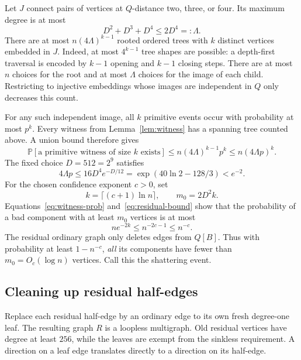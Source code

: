 \documentclass[11pt]{article}
\theoremstyle{definition}
\newcommand{\Prb}{\mathbb P}
\begin{document}
Let $J$ connect pairs of vertices at $Q$-distance two, three, or four. Its
maximum degree is at most
\[
 D^2+D^3+D^4\le2D^4=:\Lambda.
\]
There are at most $n(4\Lambda)^{k-1}$ rooted ordered trees with $k$ distinct
vertices embedded in $J$. Indeed, at most $4^{k-1}$ tree shapes are possible:
a depth-first traversal is encoded by $k-1$ opening and $k-1$ closing steps.
There are at most $n$ choices for the root and at most $\Lambda$ choices
for the image of each child. Restricting to injective embeddings whose
images are independent in $Q$ only decreases this count.

For any such independent image, all $k$ primitive events occur with
probability at most $p^k$. Every witness from Lemma~\ref{lem:witness} has
a spanning tree counted above. A union bound therefore gives
\begin{equation}\label{eq:witness-prob}
 \Prb[\text{a primitive witness of size }k\text{ exists}]
 \le n(4\Lambda)^{k-1}p^k\le n(4\Lambda p)^k.
\end{equation}
The fixed choice $D=512=2^9$ satisfies
\[
 4\Lambda p\le16D^4e^{-D/12}
 =\exp(40\ln2-128/3)<e^{-2}.
\]
For the chosen confidence exponent $c>0$, set
\begin{equation}\label{eq:residual-bound}
 k=\lceil(c+1)\ln n\rceil,\qquad m_0=2D^2k.
\end{equation}
Equations~\eqref{eq:witness-prob} and~\eqref{eq:residual-bound} show that
the probability of a bad component with at least $m_0$ vertices is at most
\begin{equation}\label{eq:shatter-success}
 ne^{-2k}\le n^{-2c-1}\le n^{-c}.
\end{equation}
The residual ordinary graph only deletes edges from $Q[B]$. Thus with
probability at least $1-n^{-c}$, \emph{all} its components have fewer than
$m_0=O_c(\log n)$ vertices. Call this the shattering event.

\subsection{Cleaning up residual half-edges}

Replace each residual half-edge by an ordinary edge to its own fresh
degree-one leaf. The resulting graph $R$ is a loopless multigraph. Old
residual vertices have degree at least $256$, while the leaves are exempt
from the sinkless requirement. A direction on a leaf edge translates
directly to a direction on its half-edge.
\end{document}
